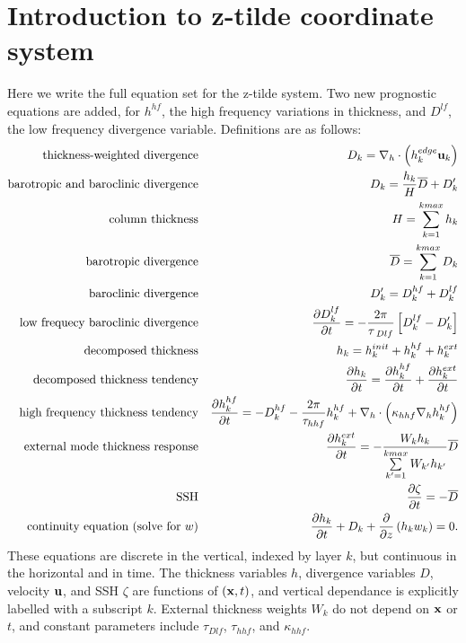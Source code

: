 \documentclass[11pt]{report}
\newcommand{\bea}{\begin{eqnarray}}
\newcommand{\eea}{\end{eqnarray}}
\begin{document}
\section{Introduction to z-tilde coordinate system}

Here we write the full equation set for the z-tilde system.
Two new prognostic equations are added, for $h^{hf}$, the high frequency variations in thickness, and $D^{lf}$, the low frequency divergence variable.  Definitions are as follows: 
\bea
\mbox{thickness-weighted divergence} && D_k = \nabla_h \cdot  \left( h^{edge}_k {\bf u}_k \right)  \label{D1} \\
\mbox{barotropic and baroclinic divergence} && 
D_k = \frac{h_k}{H}{\overline D} + D_k' \label{D}\\
\mbox{column thickness} && H=\sum\limits_{k=1}^{kmax} h_{k} \label{H}\\
\mbox{barotropic divergence} && {\overline D} = \sum\limits_{k=1}^{kmax} D_k  \label{Dbtr}\\
\mbox{baroclinic divergence} &&  D_k'= D^{hf}_k + D^{lf}_k \label{Dbcl}\\
\mbox{low frequecy baroclinic divergence} && 
  \frac{\partial D^{lf}_k}{\partial t} = - \frac{2\pi}{\tau_{\;Dlf}} \left[ D^{lf}_k - D'_k \right] \label{Dlf}\\
\mbox{decomposed thickness} && h_k = h^{init}_k + h^{hf}_k + h^{ext}_k \label{h} \\
\mbox{decomposed thickness tendency} && 
  \frac{\partial h_k}{\partial t} = \frac{\partial h^{hf}_k}{\partial t} + \frac{\partial h^{ext}_k}{\partial t} 
   \label{dhdt} \\
\mbox{high frequency thickness tendency} && 
  \frac{\partial h^{hf}_k}{\partial t} = - D^{hf}_k - \frac{2\pi}{\tau_{hhf}} h^{hf}_k 
   + \nabla_h\cdot \left( \kappa_{hhf} \nabla_h h^{hf}_k \right)
   \label{hhf} \\
\mbox{external mode thickness response} && 
  \frac{\partial h^{ext}_k}{\partial t} = - \frac{W_k h_k}{\sum\limits_{k'=1}^{kmax} W_{k'} h_{k'}}
  {\overline D} 
   \label{hext} \\
\mbox{SSH} && 
  \frac{\partial \zeta}{\partial t}  = -{\overline D}
   \label{ssh} \\
\mbox{continuity equation (solve for $w$)} && 
\label{cont} 
\frac{\partial h_k}{\partial t}  + D_k + \frac{\partial}{\partial z} \left( h_k w_k \right) = 0.
\eea
These equations are discrete in the vertical, indexed by layer $k$, but continuous in the horizontal and in time.  The thickness variables $h$, divergence variables $D$, velocity ${\bf u}$,  and SSH $\zeta$ are functions of $({\bf x},t)$, and vertical dependance is explicitly labelled with a subscript $k$.  External thickness weights $W_k$ do not depend on ${\bf x}$ or $t$, and constant parameters include 
$\tau_{Dlf}$, $\tau_{hhf}$, and $\kappa_{hhf}$.
\end{document}
